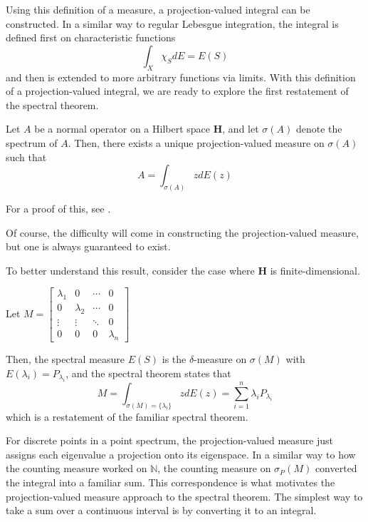 Using this definition of a measure, a projection-valued integral can be
constructed. In a similar way to regular Lebesgue integration, the integral is
defined first on characteristic functions
\[
    \int_X\chi_S dE = E(S)
\]
and then is extended to more arbitrary functions via limits. With this
definition of a projection-valued integral, we are ready to explore the first
restatement of the spectral theorem.

\begin{theorem}
    Let $A$ be a normal operator on a Hilbert space $\textbf{H}$, and let
    $\sigma(A)$ denote the spectrum of $A$. Then, there exists a unique
    projection-valued measure on $\sigma(A)$ such that
    \[
        A = \int_{\sigma(A)}zdE(z)
        \]
\end{theorem}
For a proof of this, see \cite[Ch. 6]{MacCluer2009}.

Of course, the difficulty will come in constructing the projection-valued
measure, but one is always guaranteed to exist.

To better understand this
result, consider the case where $\textbf{H}$ is finite-dimensional.
    \begin{example}
        Let $M = 
            \begin{bmatrix}
                \lambda_1 & 0 & \cdots & 0 \\
                0 & \lambda_2 & \cdots & 0 \\
                \vdots & \vdots & \ddots & 0\\
                0 & 0 & 0 & \lambda_n 
            \end{bmatrix}$

            Then, the spectral measure $E(S)$ is the $\delta$-measure on
            $\sigma(M)$ with $E(\lambda_i) = P_{\lambda_i}$, and the spectral
            theorem states that
            \[
                M = \int_{\sigma(M) = \{\lambda_i\}} zdE(z)
                  = \sum_{i=1}^n \lambda_i P_{\lambda_i}
                  \]
            which is a restatement of the familiar spectral theorem.
    \end{example}
For discrete points in a point spectrum, the projection-valued measure just
assigns each eigenvalue a projection onto its eigenspace. In a similar way to
how the counting measure worked on $\mathbb{N}$, the counting measure on
$\sigma_P(M)$ converted the integral into a familiar sum. This correspondence is
what motivates the projection-valued measure approach to the spectral theorem.
The simplest way to take a sum over a continuous interval is by converting it to
an integral.

